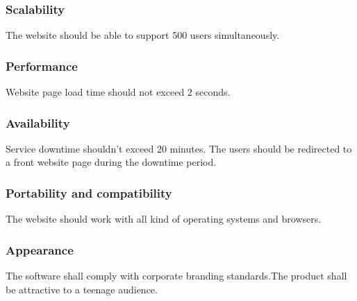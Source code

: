 \documentclass[13pt]{extarticle}
\begin{document}
\subsubsection{Scalability}
The website should be able to support 500 users simultaneously.
 \subsubsection{Performance}
Website page load time should not exceed 2 seconds.
 \subsubsection{Availability}
Service downtime shouldn’t exceed 20 minutes. The users should be redirected to a front website page during the downtime period. 
 \subsubsection{Portability and compatibility}
The website should work with all kind of operating systems and browsers. 
 \subsubsection{Appearance}
 The software shall comply with corporate branding standards.The product shall be attractive to a teenage audience.
 \newpage
\end{document}
